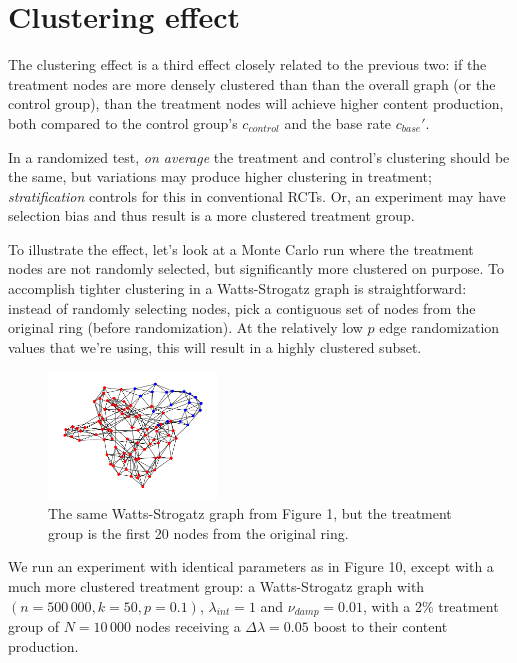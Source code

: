 \documentclass[final,5p,times,twocolumn,authoryear]{elsarticle}
\begin{document}
\section{Clustering effect}

The clustering effect is a third effect closely related to the previous two: if the treatment nodes are more densely clustered than than the overall graph (or the control group), than the treatment nodes will achieve higher content production, both compared to the control group's $c_{control}$ and the base rate $c_{base}\prime$.

In a randomized test, \textit{on average} the treatment and control's clustering should be the same, but variations may produce higher clustering in treatment; \textit{stratification} controls for this in conventional RCTs. Or, an experiment may have selection bias and thus result is a more clustered treatment group.

To illustrate the effect, let's look at a Monte Carlo run where the treatment nodes are not randomly selected, but significantly more clustered on purpose. To accomplish tighter clustering in a Watts-Strogatz graph is straightforward: instead of randomly selecting nodes, pick a contiguous set of nodes from the original ring (before randomization). At the relatively low $p$ edge randomization values that we're using, this will result in a highly clustered subset.

\begin{figure}[h]
	\centering 
	\includegraphics[width=0.4\textwidth]{figure-12.png}	
	\caption{The same Watts-Strogatz graph from Figure 1, but the treatment group is the first 20 nodes from the original ring.} 
\end{figure}

We run an experiment with identical parameters as in Figure 10, except with a much more clustered treatment group: a Watts-Strogatz graph with $(n=500\,000, k=50, p=0.1)$, $\lambda_{int} = 1$ and $\nu_{damp} = 0.01$, with a 2\% treatment group of $N=10\,000$ nodes receiving a $\Delta \lambda = 0.05$ boost to their content production.
\end{document}
